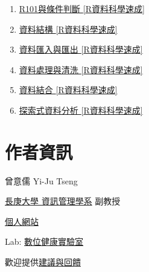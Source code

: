 \documentclass[
]{book}
\providecommand{\tightlist}{%
  \setlength{\itemsep}{0pt}\setlength{\parskip}{0pt}}
\begin{document}
\begin{enumerate}
\def\labelenumi{\arabic{enumi}.}
\tightlist
\item
  \href{https://www.youtube.com/playlist?list=PLsKtsWy-7jOyNlKv41DdqYrxOlfLr7Ku7}{R101與條件判斷 {[}R資料科學速成{]}}
\item
  \href{https://www.youtube.com/playlist?list=PLsKtsWy-7jOzST2pUcH2emqOj0sUaKXnp}{資料結構 {[}R資料科學速成{]}}
\item
  \href{https://www.youtube.com/playlist?list=PLsKtsWy-7jOzUhXV4ODHb9UYtJ2GFXqMQ}{資料匯入與匯出 {[}R資料科學速成{]}}\\
\item
  \href{https://www.youtube.com/playlist?list=PLsKtsWy-7jOx08FhoUn3WodJzqPLTVIlG}{資料處理與清洗 {[}R資料科學速成{]}}\\
\item
  \href{https://www.youtube.com/playlist?list=PLsKtsWy-7jOwsn-MLpXKPjTAhnPghpsB5}{資料結合 {[}R資料科學速成{]}}\\
\item
  \href{https://www.youtube.com/playlist?list=PLsKtsWy-7jOyPb7JgaR3dVlVzJCUMlCCU}{探索式資料分析 {[}R資料科學速成{]}}
\end{enumerate}

\hypertarget{author}{%
\chapter*{作者資訊}\label{author}}

曾意儒 Yi-Ju Tseng

\href{http://im.cgu.edu.tw/bin/home.php}{長庚大學 資訊管理學系} 副教授

\href{https://yjtseng.info/}{個人網站}

Lab: \href{https://dhlab-tseng.github.io/}{數位健康實驗室}

歡迎提供\href{https://goo.gl/forms/5Htobvwy2vsB7yiF3}{建議與回饋}

  
\end{document}
